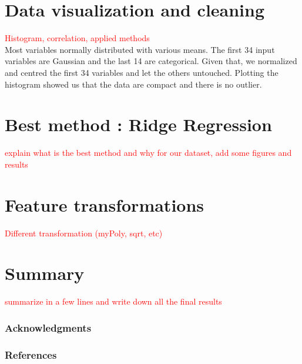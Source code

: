 \documentclass{article} %
\begin{document}
\section{Data visualization and cleaning}
\textcolor{red}{Histogram, correlation, applied methods}\\
Most variables normally distributed with various means. The first 34 input variables are Gaussian and the last 14 are categorical. Given that, we normalized and centred the first 34 variables and let the others untouched. Plotting the histogram showed us that the data are compact and there is no outlier.

\section{Best method : Ridge Regression}
\textcolor{red}{explain what is the best method and why for our dataset, add some figures and results}
\section{Feature transformations}
\textcolor{red}{Different transformation (myPoly, sqrt, etc)}
\section{Summary}
\textcolor{red}{summarize in a few lines and write down all the final results}


\subsubsection*{Acknowledgments}


\subsubsection*{References}
\end{document}

